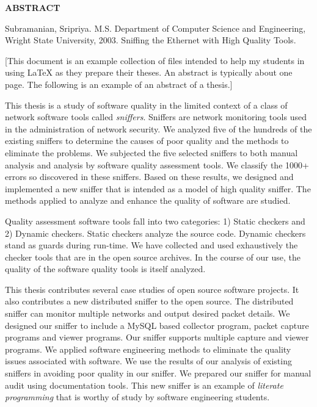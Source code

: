 \newpage
\thispagestyle{plain}

{\centering\bf ABSTRACT\\}\par\vskip 2cm

\singleSpacing
\noindent
Subramanian, Sripriya.          %
M.S.  Department of Computer Science and Engineering,
Wright State University,
2003.                           %
Sniffing the Ethernet with High Quality Tools. %

\par\vskip 2cm

\doubleSpacing

[This document is an example collection of files intended to help my
students in using LaTeX as they prepare their theses.  An abstract is
typically about one page.  The following is an example of an abstract
of a thesis.]

This thesis is a study of software quality in the limited context of a
class of network software tools called {\em sniffers}. Sniffers are
network monitoring tools used in the administration of network
security. We analyzed five of the hundreds of the existing sniffers to
determine the causes of poor quality and the methods to eliminate the
problems. We subjected the five selected sniffers to both manual
analysis and analysis by software quality assessment tools. We
classify the 1000+ errors so discovered in these sniffers. Based on
these results, we designed and implemented a new sniffer that is
intended as a model of high quality sniffer. The methods applied to
analyze and enhance the quality of software are studied.

Quality assessment software tools fall into two categories: 1) Static
checkers and 2) Dynamic checkers. Static checkers analyze the source
code. Dynamic checkers stand as guards during run-time. We have
collected and used exhaustively the checker tools that are in the open
source archives. In the course of our use, the quality of the software
quality tools is itself analyzed.

This thesis contributes several case studies of open source software
projects. It also contributes a new distributed sniffer to the open
source. The distributed sniffer can monitor multiple networks and
output desired packet details. We designed our sniffer to include a
MySQL based collector program, packet capture programs and viewer
programs. Our sniffer supports multiple capture and viewer
programs. We applied software engineering methods to eliminate the
quality issues associated with software. We use the results of our
analysis of existing sniffers in avoiding poor quality in our
sniffer. We prepared our sniffer for manual audit using documentation
tools. This new sniffer is an example of {\it literate programming}
that is worthy of study by software engineering students.

\newpage




